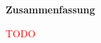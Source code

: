 \newpage

\thispagestyle{empty}

\vspace*{1cm}
\begin{center}
    {\Huge \bf Zusammenfassung}
\end{center}
\vspace*{1.4cm}

\textcolor{red}{TODO}